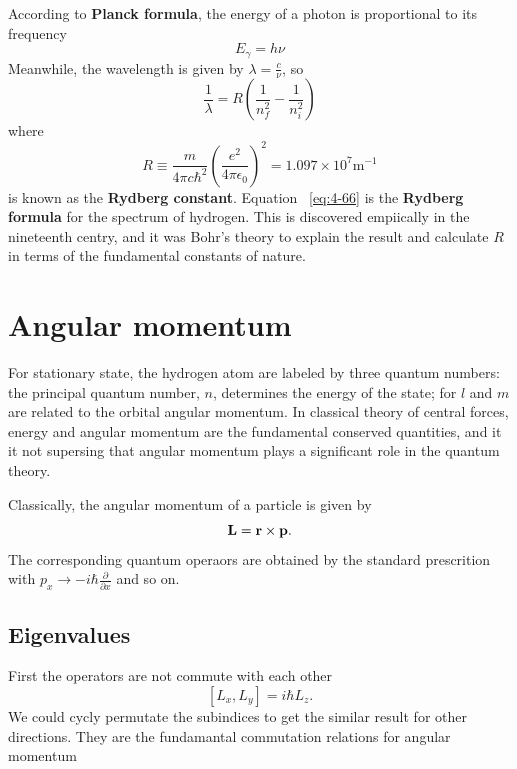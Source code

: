 According to \textbf{Planck formula}, the energy of a photon is proportional to its frequency
\begin{equation}
  \label{eq:4-65}
  E_{\gamma}  = h \nu
\end{equation}
Meanwhile, the wavelength is given by $\lambda = \frac{c}{\nu}$, so
\begin{equation}
  \label{eq:4-66}
  \frac{1}{\lambda}= R \left( \frac{1}{n_{f}^{2}} - \frac{1}{n_{i}^{2}} \right)
\end{equation}
where
\begin{equation}
  \label{eq:4-67}
  R \equiv \frac{m}{4\pi c \hbar^{2}}  \left( \frac{e^{2}}{4 \pi \epsilon_{0}} \right)^2 = 1.097 \times 10^7 \text{m}^{-1}
\end{equation}
is known as the \textbf{Rydberg constant}.
Equation ~\eqref{eq:4-66} is the \textbf{Rydberg formula} for the spectrum of hydrogen.
This is discovered empiically in the nineteenth centry, and it was Bohr's theory to explain the result and calculate $R$ in terms of the fundamental constants of nature.

\section{Angular momentum}
For stationary state, the hydrogen atom are labeled by three quantum numbers: the principal quantum number, $n$, determines the energy of the state; for $l$ and $m$ are related to the orbital angular momentum.
In classical theory of central forces, energy and angular momentum are the fundamental conserved quantities, and it it not supersing that angular momentum plays a significant role in the quantum theory.

Classically, the angular momentum of a particle is given by
\begin{equation}
  \label{eq:4-68}
  \mathbf{L}  = \mathbf{r} \times \mathbf{p}.
\end{equation}
The corresponding quantum operaors are obtained by the standard prescrition with $p_x \to - i\hbar \frac{\partial}{\partial x}$ and so on.

\subsection{Eigenvalues}
First the operators are not commute with each other
\begin{equation}
  \label{eq:4-69}
  \left[ L_x, L_y \right] = i\hbar L_{z} .
\end{equation}
We could cycly permutate the subindices to get the similar result for other directions.
They are the fundamantal commutation relations for angular momentum

